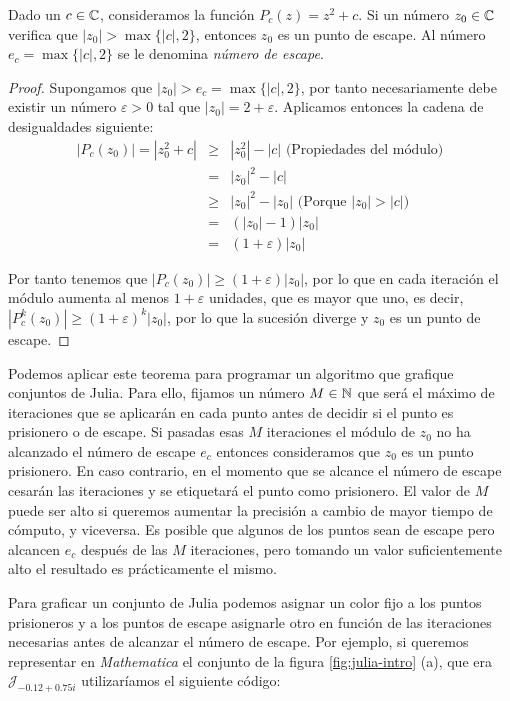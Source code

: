 \begin{teorema}
\label{th:escape}
  Dado un $c\in\mathbb{C}$, consideramos la función $P_c(z)=z^2+c$. Si un número $z_0\in\mathbb{C}$ verifica que $|z_0|>\max\{|c|,2\}$, entonces $z_0$ es un punto de escape. Al número $e_c=\max\{|c|,2\}$ se le denomina \textit{número de escape}.
\end{teorema}
\begin{proof}
  Supongamos que $|z_0|>e_c=\max\{|c|,2\}$, por tanto necesariamente debe existir un número $\varepsilon>0$ tal que $|z_0| = 2 + \varepsilon$. Aplicamos entonces la cadena de desigualdades siguiente:
  \begin{eqnarray*}
    |P_c(z_0)| = |z_0^2 + c| & \geq & |z_0^2| - |c|\text{  (Propiedades del módulo)} \\
    & = & |z_0|^2 - |c| \\
    & \geq & |z_0|^2 - |z_0|\text{  (Porque } |z_0|>|c| \text{)} \\
    & = & (|z_0|-1)|z_0| \\
    & = & (1 + \varepsilon)|z_0|
  \end{eqnarray*}

  Por tanto tenemos que $|P_c(z_0)|\geq(1 + \varepsilon)|z_0|$, por lo que en cada iteración el módulo aumenta al menos $1+\varepsilon$ unidades, que es mayor que uno, es decir, $|P_c^k(z_0)|\geq(1+\varepsilon)^k|z_0|$, por lo que la sucesión diverge y $z_0$ es un punto de escape. 
\end{proof}

Podemos aplicar este teorema para programar un algoritmo que grafique conjuntos de Julia. Para ello, fijamos un número $M\in\mathbb{N}$ que será el máximo de iteraciones que se aplicarán en cada punto antes de decidir si el punto es prisionero o de escape. Si pasadas esas $M$ iteraciones el módulo de $z_0$ no ha alcanzado el número de escape $e_c$ entonces consideramos que $z_0$ es un punto prisionero. En caso contrario, en el momento que se alcance el número de escape cesarán las iteraciones y se etiquetará el punto como prisionero. El valor de $M$ puede ser alto si queremos aumentar la precisión a cambio de mayor tiempo de cómputo, y viceversa. Es posible que algunos de los puntos sean de escape pero alcancen $e_c$ después de las $M$ iteraciones, pero tomando un valor suficientemente alto el resultado es prácticamente el mismo.

Para graficar un conjunto de Julia podemos asignar un color fijo a los puntos prisioneros y a los puntos de escape asignarle otro en función de las iteraciones necesarias antes de alcanzar el número de escape. Por ejemplo, si queremos representar en \textit{Mathematica} el conjunto de la figura \ref{fig:julia-intro} (a), que era $\mathcal{J}_{-0.12+0.75i}$ utilizaríamos el siguiente código:

